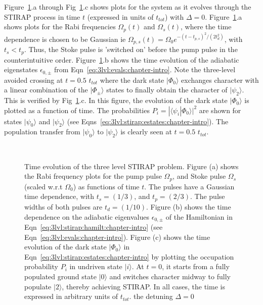 Figure~\ref{fig:evol:chapter-intro}.a through Fig~\ref{fig:evol:chapter-intro}.c shows plots for the system as it evolves through the STIRAP process in time $t$ (expressed in units of $t_{tot}$) with  $\Delta=0$. Figure~\ref{fig:evol:chapter-intro}.a shows plots for the Rabi frequencies $\Omega_p(t)$ and $\Omega_s(t)$, where the time dependence is chosen to be Gaussian ie $\Omega_{p,s}(t)=\Omega_0 e^{-(t-t_{p,s})^2/(2t^2_d)}$, with $t_s<t_p$. Thus, the Stoke pulse is 'switched on' before the pump pulse in the counterintuitive order. Figure~\ref{fig:evol:chapter-intro}.b shows the time evolution of the adiabatic eigenstates $\epsilon_{0,\pm}$ from Eqn~\ref{eq:3lvl:evals:chapter-intro}. Note the three-level avoided crossing at $t=0.5$ $t_{tot}$ where the dark state $|\Phi_0\rangle$ exchanges character with a linear combination of the $|\Phi_{\pm}\rangle$ states to finally obtain the character of $|\psi_2\rangle$. This is verified by Fig~\ref{fig:evol:chapter-intro}.c. In this figure, the evolution of the dark state $|\Phi_0\rangle$ is plotted as a function of time. The probabilities $P_i = |\langle \psi_i |\Phi_0\rangle|^2$ are shown for states $|\psi_0\rangle$ and $|\psi_2\rangle$ (see Eqns~\ref{eq:3lvl:stirap:estates:chapter-intro}). The population transfer from $|\psi_0\rangle$ to $|\psi_2\rangle$ is clearly seen at $t=0.5$ $t_{tot}$.

\begin{figure}
\ 
\caption{Time evolution of the three level STIRAP problem. Figure (a) shows the Rabi frequency plots for the pump pulse $\Omega_p$, and Stoke  pulse $\Omega_s$ (scaled 
w.r.t $\Omega_0$) as functions of time $t$. The pulses have a Gaussian time dependence, with $t_s=(1/3)$, and $t_p=(2/3)$. The pulse widths of both pulses are $t_d=(1/10)$. Figure (b) shows the time dependence on the adiabatic eigenvalues $\epsilon_{0,\pm}$ of the Hamiltonian in Eqn~\ref{eq:3lvl:stirap:hamilt:chapter-intro} (see Eqn~\ref{eq:3lvl:evals:chapter-intro}). Figure (c) shows the time evolution of the dark state $|\Phi_0\rangle$ in Eqn~\ref{eq:3lvl:stirap:estates:chapter-intro} by plotting the occupation probability $P_i$ in undriven state $|i\rangle$. At $t=0$, it starts from a fully populated ground state $|0\rangle$ and switches character midway to fully populate $|2\rangle$, thereby achieving STIRAP. In all cases, the time is expressed in arbitrary units of $t_{tot}$. the detuning $\Delta=0$}
\label{fig:evol:chapter-intro}
\end{figure}

